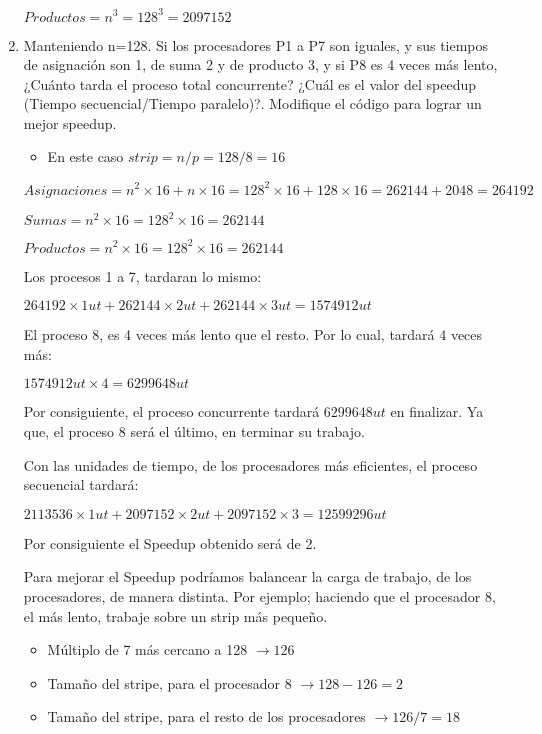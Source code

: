 \documentclass[a4paper, 10pt]{article}
\newenvironment{QandA}{
    \begin{enumerate}\bfseries}
    {\end{enumerate}
}
\newenvironment{answered}{\par\normalfont}{}
\begin{document}
\begin{QandA}
\begin{enumerate}
\begin{answered}
$Productos = n^3 = 128^3 = 2097152$ 
\end{answered}
\item Manteniendo n=128. Si los procesadores P1 a P7 son iguales, y sus tiempos de asignación son 1, de suma 2 y de producto 3, y si
P8 es 4 veces más lento, ¿Cuánto tarda el proceso total concurrente? ¿Cuál es el valor del speedup (Tiempo
secuencial/Tiempo paralelo)?. Modifique el código para lograr un mejor speedup.
\begin{answered}
\begin{itemize}
    \item En este caso $strip = n/p = 128/8 = 16$
\end{itemize}

$Asignaciones = n^2 \times 16 + n \times 16 = 128^2 \times 16 + 128 \times 16 = 262144 + 2048 = 264192$

$Sumas = n^2 \times 16 = 128^2 \times 16 = 262144$

$Productos = n^2 \times 16 = 128^2 \times 16 = 262144$

Los procesos 1 a 7, tardaran lo mismo:

$264192 \times 1 ut + 262144 \times 2 ut + 262144 \times 3 ut = 1574912 ut$

El proceso 8, es 4 veces más lento que el resto. Por lo cual, tardará 4 veces más:

$1574912 ut \times 4 = 6299648 ut$

Por consiguiente, el proceso concurrente tardará $6299648 ut$ en finalizar. Ya que, el proceso 8 será el último, en terminar su trabajo.

Con las unidades de tiempo, de los procesadores más eficientes, el proceso secuencial tardará:

$2113536 \times 1 ut + 2097152 \times 2 ut + 2097152 \times 3 = 12599296 ut$

Por consiguiente el Speedup obtenido será de 2.

Para mejorar el Speedup podríamos balancear la carga de trabajo, de los procesadores, de manera distinta. Por ejemplo; haciendo que el procesador 8, el más lento, trabaje sobre un strip más pequeño.

\begin{itemize}
    \item Múltiplo de 7 más cercano a 128 $\rightarrow 126$
    \item Tamaño del stripe, para el procesador 8 $\rightarrow 128 - 126 = 2$
    \item Tamaño del stripe, para el resto de los procesadores $\rightarrow 126/7 = 18$
\end{itemize}


\end{answered}
\end{enumerate}
\end{QandA}
\end{document}
